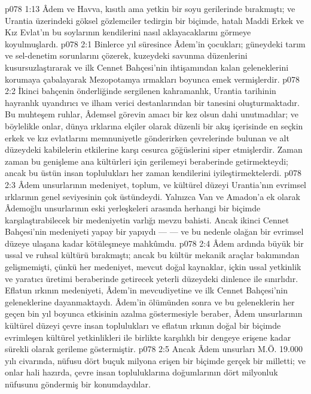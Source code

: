 \vs p078 1:13 Âdem ve Havva, kısıtlı ama yetkin bir soyu gerilerinde bırakmıştı; ve Urantia üzerindeki göksel gözlemciler tedirgin bir biçimde, hatalı Maddi Erkek ve Kız Evlat’ın bu soylarının kendilerini nasıl aklayacaklarını görmeye koyulmuşlardı.
\vs p078 2:1 Binlerce yıl süresince Âdem’in çocukları; güneydeki tarım ve sel\hyp{}denetim sorunlarını çözerek, kuzeydeki savunma düzenlerini kusursuzlaştırarak ve ilk Cennet Bahçesi’nin ihtişamından kalan geleneklerini korumaya çabalayarak Mezopotamya ırmakları boyunca emek vermişlerdir.
\vs p078 2:2 İkinci bahçenin önderliğinde sergilenen kahramanlık, Urantia tarihinin hayranlık uyandırıcı ve ilham verici destanlarından bir tanesini oluşturmaktadır. Bu muhteşem ruhlar, Âdemsel görevin amacı bir kez olsun dahi unutmadılar; ve böylelikle onlar, dünya ırklarına elçiler olarak düzenli bir akış içerisinde en seçkin erkek ve kız evlatlarını memnuniyetle gönderirken çevrelerinde bulunan ve alt düzeydeki kabilelerin etkilerine karşı cesurca göğüslerini siper etmişlerdir. Zaman zaman bu genişleme ana kültürleri için gerilemeyi beraberinde getirmekteydi; ancak bu üstün insan toplulukları her zaman kendilerini iyileştirmektelerdi.
\vs p078 2:3 Âdem unsurlarının medeniyet, toplum, ve kültürel düzeyi Urantia’nın evrimsel ırklarının genel seviyesinin çok üstündeydi. Yalnızca Van ve Amadon’a ek olarak Âdemoğlu unsurlarının eski yerleşkeleri arasında herhangi bir biçimde karşılaştırabilecek bir medeniyetin varlığı mevzu bahisti. Ancak ikinci Cennet Bahçesi’nin medeniyeti yapay bir yapıydı ---  --- ve bu nedenle olağan bir evrimsel düzeye ulaşana kadar kötüleşmeye mahkûmdu.
\vs p078 2:4 Âdem ardında büyük bir ussal ve ruhsal kültürü bırakmıştı; ancak bu kültür mekanik araçlar bakımından gelişmemişti, çünkü her medeniyet, mevcut doğal kaynaklar, içkin ussal yetkinlik ve yaratıcı üretimi beraberinde getirecek yeterli düzeydeki dinlence ile sınırlıdır. Eflatun ırkının medeniyeti, Âdem’in mevcudiyetine ve ilk Cennet Bahçesi’nin geleneklerine dayanmaktaydı. Âdem’in ölümünden sonra ve bu geleneklerin her geçen bin yıl boyunca etkisinin azalma göstermesiyle beraber, Âdem unsurlarının kültürel düzeyi çevre insan toplulukları ve eflatun ırkının doğal bir biçimde evrimleşen kültürel yetkinlikleri ile birlikte karşılıklı bir dengeye erişene kadar sürekli olarak gerileme göstermiştir.
\vs p078 2:5 Ancak Âdem unsurları M.Ö. 19.000 yılı civarında, nüfusu dört buçuk milyona erişen bir biçimde gerçek bir milletti; ve onlar hali hazırda, çevre insan topluluklarına doğumlarının dört milyonluk nüfusunu göndermiş bir konumdaydılar.
